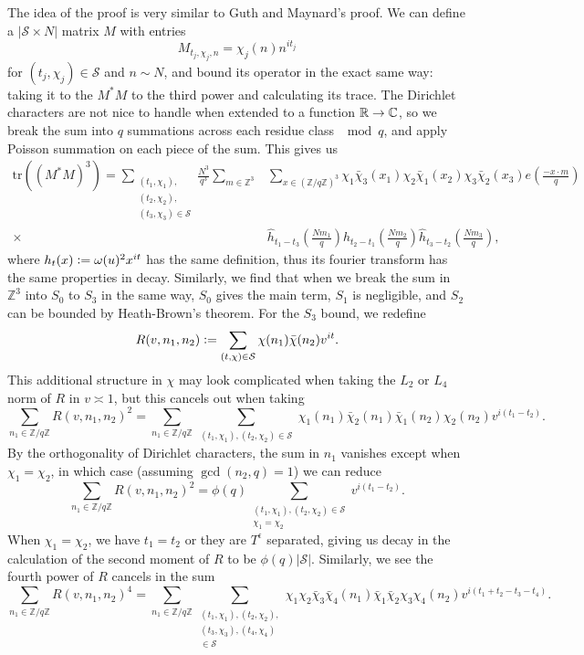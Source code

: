 The idea of the proof is very similar to Guth and Maynard's proof. We can define a $|\mathcal{S}\times N|$ matrix $M$ with entries
\[
    M_{t_j,\chi_j,n} = \chi_j(n)n^{it_j}
\]
for $(t_j,\chi_j)\in\mathcal{S}$ and $n\sim N$, and bound its operator in the exact same way: taking it to the $M^*M$ to the third power and calculating its trace. The Dirichlet characters are not nice to handle when extended to a function $\mathbb{R} \to \mathbb{C}$, so we break the sum into $q$ summations across each residue class $\mod q$, and apply Poisson summation on each piece of the sum. This gives us \begin{align*}
    \textrm{tr}((M^*M)^3)=\sum_{\substack{(t_1,\chi_1),\\(t_2,\chi_2),\\(t_3,\chi_3)\in\mathcal{S}}}
    \frac{N^3}{q^3}\sum_{m\in\mathbb{Z}^3}&\sum_{x\in (\mathbb{Z}/q\mathbb{Z})^3}\chi_1\bar{\chi}_3(x_1)\chi_2\bar{\chi}_1(x_2)\chi_3\bar{\chi}_2(x_3) e\left(\frac{-x\cdot m}{q}\right)\\
    \times \ &\hat{h}_{t_1-t_3}\left(\frac{Nm_1}{q}\right)\hat{h}_{t_2-t_1}\left(\frac{Nm_2}{q}\right)\hat{h}_{t_3-t_2}\left(\frac{Nm_3}{q}\right),
\end{align*}
where $h_t(x) \mathrel{\mathop:}= \omega(u)^2 x^{it}$ has the same definition, thus its fourier transform has the same properties in decay. Similarly, we find that when we break the sum in $\mathbb{Z}^3$ into $S_0$ to $S_3$ in the same way, $S_0$ gives the main term, $S_1$ is negligible, and $S_2$ can be bounded by Heath-Brown's theorem. For the $S_3$ bound, we redefine \[
R(v,n_1,n_2)\mathrel{\mathop:}= \sum_{(t,\chi)\in\mathcal{S}}\chi(n_1)\bar{\chi}(n_2) v^{it}.
\]
This additional structure in $\chi$ may look complicated when taking the $L_2$ or $L_4$ norm of $R$ in $v\asymp 1$, but this cancels out when taking \[
\sum_{n_1\in\mathbb{Z}/q\mathbb{Z}} R(v,n_1,n_2)^2 = \sum_{n_1\in\mathbb{Z}/q\mathbb{Z}}\sum_{\substack{(t_1,\chi_1),(t_2,\chi_2)\in\mathcal{S}}}\chi_1(n_1)\bar\chi_2(n_1)\bar\chi_1(n_2)\chi_2(n_2) v^{i(t_1-t_2)}.
\]
By the orthogonality of Dirichlet characters, the sum in $n_1$ vanishes except when $\chi_1=\chi_2$, in which case (assuming $\gcd(n_2,q)=1$) we can reduce \[
    \sum_{n_1\in\mathbb{Z}/q\mathbb{Z}} R(v,n_1,n_2)^2 =\phi(q) \sum_{\substack{(t_1,\chi_1),(t_2,\chi_2)\in\mathcal{S}\\\chi_1=\chi_2}}v^{i(t_1-t_2)}.
\]
When $\chi_1=\chi_2$, we have $t_1=t_2$ or they are $T^\epsilon$ separated, giving us decay in the calculation of the second moment of $R$ to be $\phi(q)|\mathcal{S}|$.
Similarly, we see the fourth power of $R$ cancels in the sum \[
    \sum_{n_1\in\mathbb{Z}/q\mathbb{Z}} R(v,n_1,n_2)^4 = \sum_{n_1\in\mathbb{Z}/q\mathbb{Z}}\sum_{\substack{(t_1,\chi_1),(t_2,\chi_2),\\(t_3,\chi_3),(t_4,\chi_4)\\\in\mathcal{S}}}\chi_1\chi_2\bar\chi_3\bar\chi_4(n_1)\bar\chi_1\bar\chi_2\chi_3\chi_4(n_2) v^{i(t_1+t_2-t_3-t_4)}.
\]
